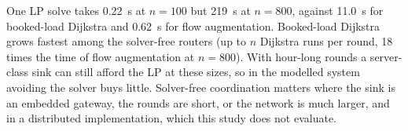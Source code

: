 One LP solve takes 0.22~s at $n=100$ but 219~s at $n=800$, against 11.0~s for booked-load Dijkstra and 0.62~s for flow augmentation. Booked-load Dijkstra grows fastest among the solver-free routers (up to $n$ Dijkstra runs per round, 18 times the time of flow augmentation at $n=800$). With hour-long rounds a server-class sink can still afford the LP at these sizes, so in the modelled system avoiding the solver buys little. Solver-free coordination matters where the sink is an embedded gateway, the rounds are short, or the network is much larger, and in a distributed implementation, which this study does not evaluate.
